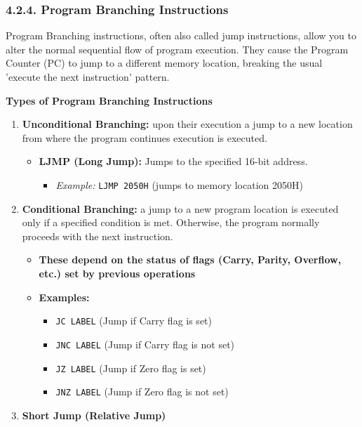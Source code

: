\documentclass[
]{article}
\begin{document}
\hypertarget{424-program-branching-instructions}{%
\subsubsection{4.2.4. Program Branching
Instructions}\label{424-program-branching-instructions}}

Program Branching instructions, often also called jump instructions,
allow you to alter the normal sequential flow of program execution. They
cause the Program Counter (PC) to jump to a different memory location,
breaking the usual 'execute the next instruction' pattern.

\textbf{Types of Program Branching Instructions}

\begin{enumerate}
\def\labelenumi{\arabic{enumi}.}
\item
  \textbf{Unconditional Branching:} upon their execution a jump to a new
  location from where the program continues execution is executed.

  \begin{itemize}
  \item
    \textbf{LJMP (Long Jump):} Jumps to the specified 16-bit address.

    \begin{itemize}
    \item
      \emph{Example:} \texttt{LJMP\ 2050H} (jumps to memory location
      2050H)
    \end{itemize}
  \end{itemize}
\item
  \textbf{Conditional Branching:} a jump to a new program location is
  executed only if a specified condition is met. Otherwise, the program
  normally proceeds with the next instruction.

  \begin{itemize}
  \item
    \textbf{These depend on the status of flags (Carry, Parity,
    Overflow, etc.) set by previous operations}
  \item
    \textbf{Examples:}

    \begin{itemize}
    \item
      \texttt{JC\ LABEL} (Jump if Carry flag is set)
    \item
      \texttt{JNC\ LABEL} (Jump if Carry flag is not set)
    \item
      \texttt{JZ\ LABEL} (Jump if Zero flag is set)
    \item
      \texttt{JNZ\ LABEL} (Jump if Zero flag is not set)
    \end{itemize}
  \end{itemize}
\item
  \textbf{Short Jump (Relative Jump)}


\end{enumerate}
\end{document}

